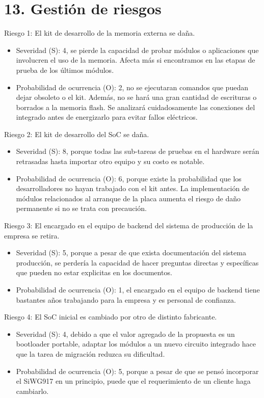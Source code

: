 \documentclass[
11pt, %
]{charter}
\begin{document}
\section{13. Gestión de riesgos}
\label{sec:riesgos}

Riesgo 1: El kit de desarrollo de la memoria externa se daña.
\begin{itemize}
	\item Severidad (S): 4, se pierde la capacidad de probar módulos o aplicaciones que involucren el uso de la memoria. Afecta más si encontramos
	en las etapas de prueba de los últimos módulos.
	\item Probabilidad de ocurrencia (O): 2, no se ejecutaran comandos que puedan dejar obsoleto o el kit. Además, no se hará una gran cantidad de escrituras o borrados a la memoria flash. Se analizará cuidadosamente las conexiones del integrado antes de energizarlo para evitar fallos eléctricos.
\end{itemize}   

Riesgo 2: El kit de desarrollo del SoC se daña.
\begin{itemize}
	\item Severidad (S): 8, porque todas las sub-tareas de pruebas en el hardware serán retrasadas hasta importar otro equipo y su costo es notable.
	\item Probabilidad de ocurrencia (O): 6, porque existe la probabilidad que los desarrolladores no hayan trabajado con el kit antes. La implementación de módulos relacionados al arranque de la placa aumenta el riesgo de daño permanente si no se trata con precaución.
\end{itemize}

Riesgo 3: El encargado en el equipo de backend del sistema de producción de la empresa se retira.
\begin{itemize}
	\item Severidad (S): 5, porque a pesar de que exista documentación del sistema producción, se perdería la capacidad de hacer preguntas directas y específicas que pueden no estar explicitas en los documentos.
	\item Probabilidad de ocurrencia (O): 1, el encargado en el equipo de backend tiene bastantes años trabajando para la empresa y es personal de confianza.
\end{itemize}

Riesgo 4: El SoC inicial es cambiado por otro de distinto fabricante.
\begin{itemize}
	\item Severidad (S): 4, debido a que el valor agregado de la propuesta es un bootloader portable, adaptar los módulos a un nuevo circuito integrado hace que la tarea de migración reduzca su dificultad.
	\item Probabilidad de ocurrencia (O): 5, porque a pesar de que se pensó incorporar el SiWG917 en un principio, puede que el requerimiento de un cliente haga cambiarlo. 
\end{itemize}
\end{document}
